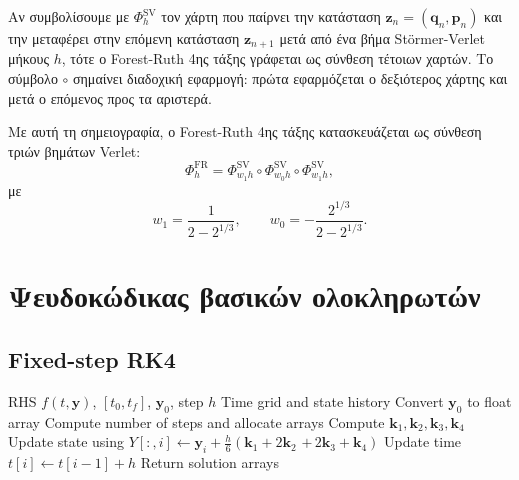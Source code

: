 \documentclass[11pt,a4paper]{report}
\begin{document}
Αν συμβολίσουμε με $\Phi_h^{\mathrm{SV}}$ τον χάρτη που παίρνει την κατάσταση
$\mathbf{z}_n=(\mathbf{q}_n,\mathbf{p}_n)$ και την μεταφέρει στην επόμενη
κατάσταση $\mathbf{z}_{n+1}$ μετά από ένα βήμα St\"ormer-Verlet μήκους $h$,
τότε ο Forest-Ruth 4ης τάξης γράφεται ως σύνθεση τέτοιων χαρτών. Το σύμβολο
$\circ$ σημαίνει διαδοχική εφαρμογή: πρώτα εφαρμόζεται ο δεξιότερος χάρτης και
μετά ο επόμενος προς τα αριστερά.

Με αυτή τη σημειογραφία, ο Forest-Ruth 4ης τάξης κατασκευάζεται ως σύνθεση
τριών βημάτων Verlet:
\begin{equation}
\Phi_h^{\mathrm{FR}}=
\Phi_{w_1 h}^{\mathrm{SV}}\circ
\Phi_{w_0 h}^{\mathrm{SV}}\circ
\Phi_{w_1 h}^{\mathrm{SV}},
\end{equation}
με
\begin{equation}
w_1=\frac{1}{2-2^{1/3}},
\qquad
w_0=-\frac{2^{1/3}}{2-2^{1/3}}.
\end{equation}

\section{Ψευδοκώδικας βασικών ολοκληρωτών}

\subsection*{Fixed-step RK4}
\begin{algorithm}[H]
\caption{\texttt{integrate\_system\_rk4}}
\label{alg:rk4-fixed-tuned}
\begingroup
\small
\setlength{\parskip}{0pt}
\begin{algorithmic}[1]
\Require RHS $f(t,\mathbf{y})$, $[t_0,t_f]$, $\mathbf{y}_0$, step $h$
\Ensure Time grid and state history
\State Convert $\mathbf{y}_0$ to float array
\State Compute number of steps and allocate arrays
  \State Compute $\mathbf{k}_1,\mathbf{k}_2,\mathbf{k}_3,\mathbf{k}_4$
  \State Update state using
  \Statex \hspace{\algorithmicindent} $Y[:,i] \gets \mathbf{y}_i + \tfrac{h}{6}\left(\mathbf{k}_1 + 2\mathbf{k}_2\right.$
  \Statex \hspace{2\algorithmicindent} $\left.+\,2\mathbf{k}_3 + \mathbf{k}_4\right)$
  \State Update time $t[i] \gets t[i-1] + h$
\EndFor
\State Return solution arrays
\end{algorithmic}
\endgroup
\end{algorithm}
\end{document}
